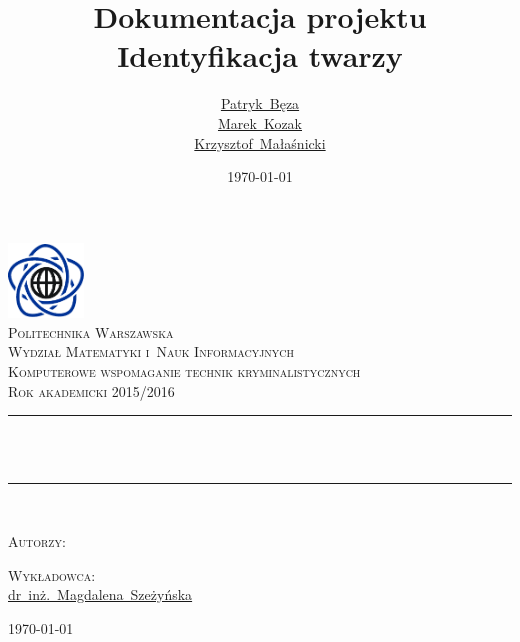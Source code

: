 \documentclass[a4paper,titlepage]{article}
\title{Dokumentacja projektu\\[0.6em]Identyfikacja twarzy}
\author{
    \href{mailto:bezap@student.mini.pw.edu.pl}{Patryk~Bęza}\\[0.7em]
    \href{mailto:kozakm@student.mini.pw.edu.pl}{Marek~Kozak}\\[0.7em]
    \href{mailto:malasnickik@student.mini.pw.edu.pl}{Krzysztof~Małaśnicki}\\[0.7em]
}
\date{\today}
\newcommand\blankpage{%
	\null
	\thispagestyle{empty}%
	\addtocounter{page}{-1}%
	\newpage}
\theoremstyle{break}
\numberwithin{equation}{subsection}
\begin{document}
\makeatletter
\renewcommand{\ALG@name}{Algorytm}
\begin{titlepage}
\newcommand{\HRule}{\rule{\linewidth}{0.5mm}}
\center

\includegraphics[width=2.0cm]{img/mini}\\[1.5cm]
\textsc{\LARGE Politechnika Warszawska}\\[0.3cm]
\textsc{\Large Wydział Matematyki i~Nauk Informacyjnych}\\[1.5cm]
\textsc{\large Komputerowe wspomaganie technik kryminalistycznych}\\[0.2cm]
\textsc{\small Rok akademicki 2015/2016}\\[1.5cm]

\HRule \\[0.7cm]
{ \huge \bfseries \@title}\\[0.7cm]
\HRule \\[1.75cm]

\begin{minipage}[t]{0.4\textwidth}
\begin{flushleft}\large
\textsc{Autorzy:}\\[3mm]
\@author
\end{flushleft}
\end{minipage}
\begin{minipage}[t]{0.4\textwidth}
\begin{flushright}\large
\textsc{Wykładowca:}\\[3mm]
\href{mailto:m.szezynska@ise.pw.edu.pl}{dr~inż.~Magdalena~Szeżyńska}\\[1cm]
\end{flushright}
\end{minipage}
\vfill
{\large \today}

\end{titlepage}

\blankpage
\tableofcontents
\clearpage
\blankpage

\end{document}
